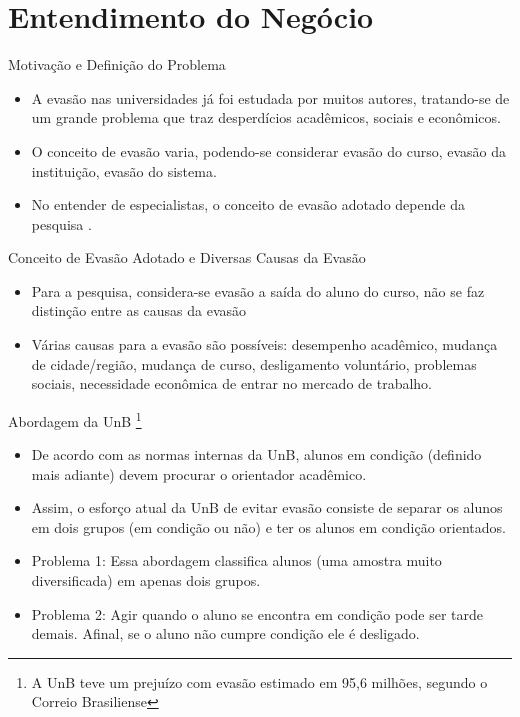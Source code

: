 \section{Entendimento do Negócio}

\begin{frame}{Motivação e Definição do Problema}
    \begin{itemize}[itemsep=3ex]
        \item A evasão nas universidades já foi estudada por muitos autores, tratando-se de
        um grande problema que traz desperdícios acadêmicos, sociais e econômicos.
        \item O conceito de evasão varia, podendo-se considerar evasão do curso,
            evasão da instituição, evasão do sistema.
        \item No entender de especialistas, o conceito de evasão adotado depende da
            pesquisa \cite{mec_conceito_evasao}.
    \end{itemize}
\end{frame}

\begin{frame}{Conceito de Evasão Adotado e Diversas Causas da Evasão}
    \begin{itemize}[itemsep=3ex]
        \item Para a pesquisa, considera-se evasão a saída do aluno do curso, não
            se faz distinção entre as causas da evasão
        \item Várias causas para a evasão são possíveis: desempenho acadêmico,
            mudança de cidade/região, mudança de curso, desligamento voluntário,
            problemas sociais, necessidade econômica de entrar no mercado de
            trabalho.
    \end{itemize}
\end{frame}

\begin{frame}{Abordagem da UnB 
        \footnote{A UnB teve um prejuízo com evasão estimado em 95,6
        milhões, segundo o Correio Brasiliense}}
    \begin{itemize}[itemsep=3ex]
        \item De acordo com as normas internas da UnB, alunos em condição (definido
            mais adiante) devem procurar o orientador acadêmico.
        \item Assim, o esforço atual da UnB de evitar evasão consiste de separar os
            alunos em dois grupos (em condição ou não) e ter os alunos em condição
            orientados.
        \item Problema 1: Essa abordagem classifica alunos (uma amostra muito diversificada) em
            apenas dois grupos.
        \item Problema 2: Agir quando o aluno se encontra em condição pode ser tarde
            demais. Afinal, se o aluno não cumpre condição ele é desligado. 
    \end{itemize}
\end{frame}

